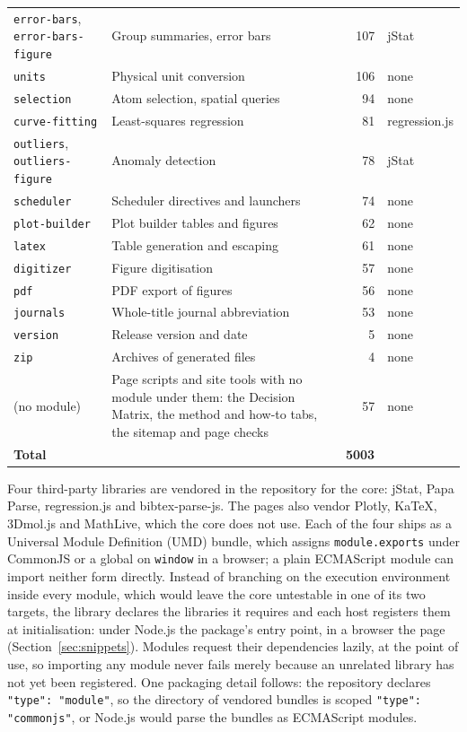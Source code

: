 \documentclass[11pt,a4paper]{article}
\begin{document}
\begin{table}[htbp]
\begin{tabular}{@{}>{\raggedright\arraybackslash}p{4.4cm}>{\raggedright\arraybackslash}p{5.3cm}rl@{}}
\texttt{error-bars}, \texttt{error-bars-figure} & Group summaries, error bars & 107 & jStat \\
\texttt{units} & Physical unit conversion & 106 & none \\
\texttt{selection} & Atom selection, spatial queries & 94 & none \\
\texttt{curve-fitting} & Least-squares regression & 81 & regression.js \\
\texttt{outliers}, \texttt{outliers-figure} & Anomaly detection & 78 & jStat \\
\texttt{scheduler} & Scheduler directives and launchers & 74 & none \\
\texttt{plot-builder} & Plot builder tables and figures & 62 & none \\
\texttt{latex} & Table generation and escaping & 61 & none \\
\texttt{digitizer} & Figure digitisation & 57 & none \\
\texttt{pdf} & PDF export of figures & 56 & none \\
\texttt{journals} & Whole-title journal abbreviation & 53 & none \\
\texttt{version} & Release version and date & 5 & none \\
\texttt{zip} & Archives of generated files & 4 & none \\
(no module) & Page scripts and site tools with no module under them: the Decision Matrix, the method and how-to tabs, the sitemap and page checks & 57 & none \\
\midrule
\textbf{Total} & & \textbf{5003} & \\
\bottomrule
\end{tabular}
\end{table}

Four third-party libraries are vendored in the repository for the core: jStat,
Papa Parse, regression.js and bibtex-parse-js. The pages also vendor Plotly,
KaTeX, 3Dmol.js and MathLive, which the core does not use. Each of the four
ships as a Universal Module Definition (UMD) bundle, which assigns
\texttt{module.exports} under CommonJS or a global on \texttt{window} in a
browser; a plain ECMAScript module can import neither form directly. Instead of
branching on the execution environment inside every module, which would leave
the core untestable in one of its two targets, the library declares the
libraries it requires and each host registers them at initialisation: under
Node.js the package's entry point, in a browser the page
(Section~\ref{sec:snippets}). Modules request their dependencies lazily, at the
point of use, so importing any module never fails merely because an unrelated
library has not yet been registered. One packaging detail follows: the
repository declares \texttt{"type": "module"}, so the directory of vendored
bundles is scoped \texttt{"type": "commonjs"}, or Node.js would parse the bundles
as ECMAScript modules.
\end{document}
